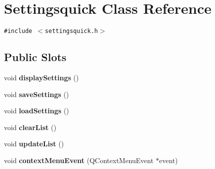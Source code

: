 \hypertarget{class_settingsquick}{
\section{Settingsquick Class Reference}
\label{class_settingsquick}
}
{\tt \#include $<$settingsquick.h$>$}

\subsection*{Public Slots}
\begin{CompactItemize}
\item 
\hypertarget{class_settingsquick_50bb89e61cc55729b703b223a57a64a1}{
void \textbf{displaySettings} ()}
\label{class_settingsquick_50bb89e61cc55729b703b223a57a64a1}

\item 
\hypertarget{class_settingsquick_d7ef86d8b4c09fc08295b8b8c4eb097d}{
void \textbf{saveSettings} ()}
\label{class_settingsquick_d7ef86d8b4c09fc08295b8b8c4eb097d}

\item 
\hypertarget{class_settingsquick_99b7eda9b947eb8d798d27837f7cf0a2}{
void \textbf{loadSettings} ()}
\label{class_settingsquick_99b7eda9b947eb8d798d27837f7cf0a2}

\item 
\hypertarget{class_settingsquick_08c5bea28bd08d06fafd6bd34f135ac4}{
void \textbf{clearList} ()}
\label{class_settingsquick_08c5bea28bd08d06fafd6bd34f135ac4}

\item 
\hypertarget{class_settingsquick_ee1dc94c7fc2c44c79d51b12079757bc}{
void \textbf{updateList} ()}
\label{class_settingsquick_ee1dc94c7fc2c44c79d51b12079757bc}

\item 
\hypertarget{class_settingsquick_35c957e195228d3ef16365c307c41016}{
void \textbf{contextMenuEvent} (QContextMenuEvent $\ast$event)}
\label{class_settingsquick_35c957e195228d3ef16365c307c41016}

\end{CompactItemize}

